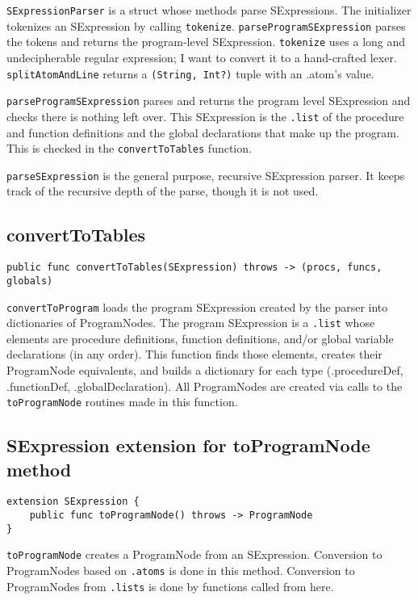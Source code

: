 \texttt{SExpressionParser} is a struct whose methods parse SExpressions. The initializer tokenizes an
SExpression by calling \texttt{tokenize}. \texttt{parseProgramSExpression}
parses the tokens and returns the program-level SExpression.
\texttt{tokenize} uses a long and undecipherable regular expression; I want to
convert it to a hand-crafted lexer. \texttt{splitAtomAndLine} returns a
\texttt{(String, Int?)} tuple with an .atom's value.

\texttt{parseProgramSExpression} parses and returns the program level SExpression and checks
there is nothing left over. This SExpression is the \texttt{.list} of the procedure and function
definitions and the global declarations that make up the program.
This is checked in the \texttt{convertToTables} function.

\texttt{parseSExpression} is the general purpose, recursive SExpression parser.
It keeps track of the recursive depth of the parse, though it
is not used.


\subsection{convertToTables}

\begin{verbatim}
public func convertToTables(SExpression) throws -> (procs, funcs, globals)
\end{verbatim}

\texttt{convertToProgram} loads the program SExpression created
by the parser into dictionaries of ProgramNodes.
The program SExpression is a \texttt{.list} whose elements are procedure definitions,
function definitions, and/or global variable declarations (in any order).
This function finds those elements, creates their ProgramNode equivalents, and builds a
dictionary for each type (.procedureDef, .functionDef, .globalDeclaration).
All ProgramNodes are created via calls to the \texttt{toProgramNode} routines made
in this function. 

\subsection{SExpression extension for toProgramNode method}

\begin{verbatim}
extension SExpression {
    public func toProgramNode() throws -> ProgramNode
}
\end{verbatim}

\texttt{toProgramNode} creates a ProgramNode from an SExpression. Conversion
to ProgramNodes based on \texttt{.atoms} is done\texttt{} in this method.
Conversion to ProgramNodes from \texttt{.lists} is done by functions called from
here.

